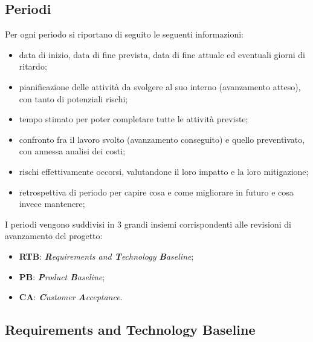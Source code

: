\subsection{Periodi}
Per ogni periodo si riportano di seguito le seguenti informazioni:
\begin{itemize}
    \item data di inizio, data di fine prevista, data di fine attuale ed eventuali giorni di ritardo;
    \item pianificazione delle attività da svolgere al suo interno (avanzamento atteso), con tanto di potenziali rischi;
    \item tempo stimato per poter completare tutte le attività previste;
    \item confronto fra il lavoro svolto (avanzamento conseguito) e quello preventivato, con annessa analisi dei costi;
    \item rischi effettivamente occorsi, valutandone il loro impatto e la loro mitigazione;
    \item retrospettiva di periodo per capire cosa e come migliorare in futuro e cosa invece mantenere;
\end{itemize}
I periodi vengono suddivisi in 3 grandi insiemi corrispondenti alle revisioni di avanzamento del progetto:
\begin{itemize}
    \item \textbf{RTB}: \textit{\textbf{R}equirements and \textbf{T}echnology \textbf{B}aseline};
    \item \textbf{PB}:  \textit{\textbf{P}roduct \textbf{B}aseline};
    \item \textbf{CA}:  \textit{\textbf{C}ustomer \textbf{A}cceptance}.
\end{itemize}

\subsection{Requirements and Technology Baseline}
